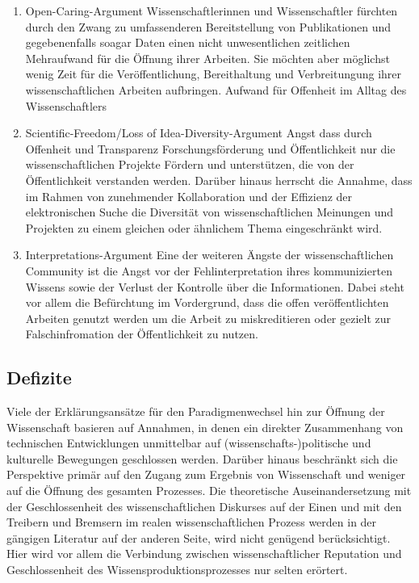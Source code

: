 \begin{enumerate}
\item Open-Caring-Argument
Wissenschaftlerinnen und Wissenschaftler fürchten durch den Zwang zu umfassenderen Bereitstellung von Publikationen und gegebenenfalls soagar Daten einen nicht unwesentlichen zeitlichen Mehraufwand für die Öffnung ihrer Arbeiten. Sie möchten aber möglichst wenig Zeit für die Veröffentlichung, Bereithaltung und Verbreitungung ihrer wissenschaftlichen Arbeiten aufbringen.
	Aufwand für Offenheit im Alltag des Wissenschaftlers
\item Scientific-Freedom/Loss of Idea-Diversity-Argument
Angst dass durch Offenheit und Transparenz Forschungsförderung und Öffentlichkeit nur die wissenschaftlichen Projekte Fördern und unterstützen, die von der Öffentlichkeit verstanden werden. Darüber hinaus herrscht die Annahme, dass im Rahmen von zunehmender Kollaboration und der Effizienz der elektronischen Suche die Diversität von wissenschaftlichen Meinungen und Projekten zu einem gleichen oder ähnlichem Thema eingeschränkt wird\cite{Evans_2008}.
\item Interpretations-Argument
Eine der weiteren Ängste der wissenschaftlichen Community ist die Angst vor der Fehlinterpretation ihres kommunizierten Wissens sowie der Verlust der Kontrolle über die Informationen. Dabei steht vor allem die Befürchtung im Vordergrund, dass die offen veröffentlichten Arbeiten genutzt werden um die Arbeit zu miskreditieren oder gezielt zur Falschinfromation der Öffentlichkeit zu nutzen.
\end{enumerate}



\subsection{Defizite}
Viele der Erklärungsansätze für den Paradigmenwechsel hin zur Öffnung der Wissenschaft basieren auf Annahmen, in denen ein direkter Zusammenhang von technischen Entwicklungen unmittelbar auf (wissenschafts-)politische und kulturelle Bewegungen geschlossen werden. Darüber hinaus beschränkt sich die Perspektive primär auf den Zugang zum Ergebnis von Wissenschaft und weniger auf die Öffnung des gesamten Prozesses. Die theoretische Auseinandersetzung mit der Geschlossenheit des wissenschaftlichen Diskurses  auf der Einen und mit den Treibern und Bremsern im realen wissenschaftlichen Prozess werden in der gängigen Literatur auf der anderen Seite, wird nicht genügend berücksichtigt. Hier wird vor allem die Verbindung zwischen wissenschaftlicher Reputation und Geschlossenheit des Wissensproduktionsprozesses nur selten erörtert.
